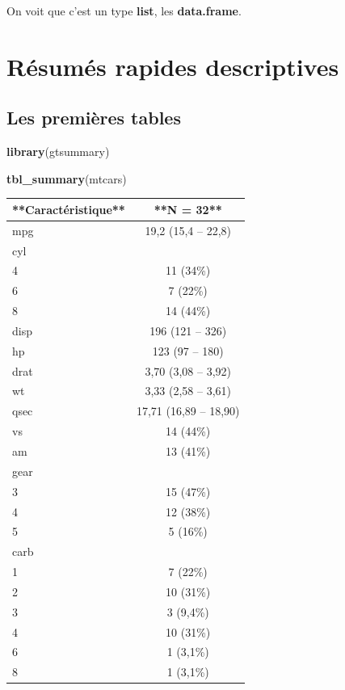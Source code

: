 \documentclass[
]{book}
\newenvironment{Shaded}{\begin{snugshade}}{\end{snugshade}}
\newcommand{\FunctionTok}[1]{\textcolor[rgb]{0.13,0.29,0.53}{\textbf{#1}}}
\newcommand{\NormalTok}[1]{#1}
\begin{document}
On voit que c'est un type \textbf{list}, les \textbf{data.frame}.

\chapter{Résumés rapides descriptives}\label{ruxe9sumuxe9s-rapides-descriptives}

\section{Les premières tables}\label{les-premiuxe8res-tables}

\begin{Shaded}
\begin{Highlighting}[]
\FunctionTok{library}\NormalTok{(gtsummary)}
\end{Highlighting}
\end{Shaded}

\begin{Shaded}
\begin{Highlighting}[]
\FunctionTok{tbl\_summary}\NormalTok{(mtcars)}
\end{Highlighting}
\end{Shaded}

\begin{tabular}{l|c}
\hline
**Caractéristique** & **N = 32**\\
\hline
mpg & 19,2 (15,4 – 22,8)\\
\hline
cyl & \\
\hline
4 & 11 (34\%)\\
\hline
6 & 7 (22\%)\\
\hline
8 & 14 (44\%)\\
\hline
disp & 196 (121 – 326)\\
\hline
hp & 123 (97 – 180)\\
\hline
drat & 3,70 (3,08 – 3,92)\\
\hline
wt & 3,33 (2,58 – 3,61)\\
\hline
qsec & 17,71 (16,89 – 18,90)\\
\hline
vs & 14 (44\%)\\
\hline
am & 13 (41\%)\\
\hline
gear & \\
\hline
3 & 15 (47\%)\\
\hline
4 & 12 (38\%)\\
\hline
5 & 5 (16\%)\\
\hline
carb & \\
\hline
1 & 7 (22\%)\\
\hline
2 & 10 (31\%)\\
\hline
3 & 3 (9,4\%)\\
\hline
4 & 10 (31\%)\\
\hline
6 & 1 (3,1\%)\\
\hline
8 & 1 (3,1\%)\\
\hline
\end{tabular}
\end{document}
